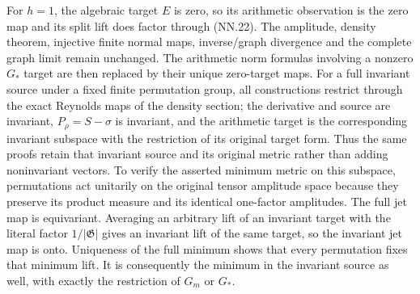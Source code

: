 For \(h=1\), the algebraic target \(E\) is zero, so its arithmetic
observation is the zero map and its split lift does factor through
(NN.22). The amplitude, density theorem, injective finite normal maps,
inverse/graph divergence and the complete graph limit remain unchanged.
The arithmetic norm formulas involving a nonzero \(G_*\) target are
then replaced by their unique zero-target maps. For a full invariant
source under a fixed finite permutation group, all constructions
restrict through the exact Reynolds maps of the density section; the
derivative and source are invariant, \(P_\rho=S-\sigma\) is invariant,
and the arithmetic target is the corresponding invariant subspace with
the restriction of its original target form. Thus the same proofs
retain that invariant source and its original metric rather than adding
noninvariant vectors.
To verify the asserted minimum metric on this subspace, permutations
act unitarily on the original tensor amplitude space because they
preserve its product measure and its identical one-factor amplitudes.
The full jet map is equivariant. Averaging an arbitrary lift of an
invariant target with the literal factor \(1/|\mathfrak G|\) gives an
invariant lift of the same target, so the invariant jet map is onto.
Uniqueness of the full minimum shows that every permutation fixes that
minimum lift. It is consequently the minimum in the invariant source
as well, with exactly the restriction of \(G_m\) or \(G_*\).
